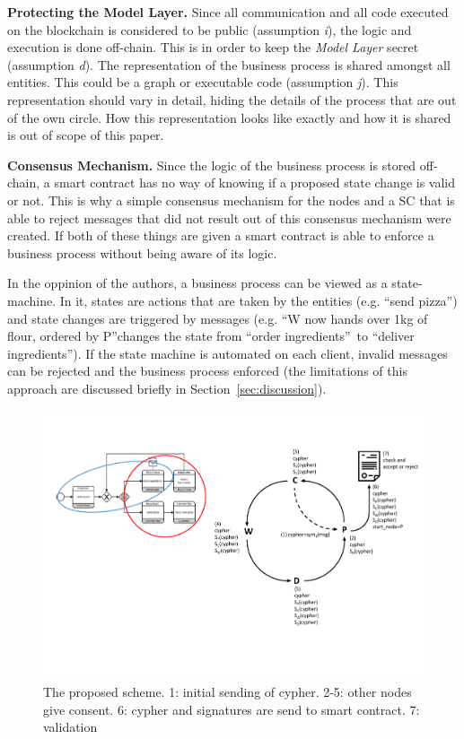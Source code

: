 \documentclass[runningheads]{llncs}
\newcommand{\ber}[1]{\textit{#1}}
\newcommand{\refsec}[1]{Section~\ref{#1}}
\renewcommand{\bigbreak}{}
\newcommand{\quotel}{``}
\newcommand{\quoter}{''}
\begin{document}
\bigbreak
\textbf{Protecting the Model Layer.} Since all communication and all code executed on the blockchain is considered to be public  (assumption \ber{i}), the logic and execution is done off-chain. This is in order to keep the \ber{Model Layer} secret (assumption \ber{d}). The representation of the business process is shared amongst all entities. This could be a graph or executable code (assumption \ber{j}). This representation should vary in detail, hiding the details of the process that are out of the own circle. How this representation looks like exactly and how it is shared is out of scope of this paper.


\bigbreak
\textbf{Consensus Mechanism.} Since the logic of the business process is stored off-chain, a smart contract has no way of knowing if a proposed state change is valid or not. This is why a simple consensus mechanism for the nodes and a SC that is able to reject messages that did not result out of this consensus mechanism were created. If both of these things are given a smart contract is able to enforce a business process without being aware of its logic. 

In the oppinion of the authors, a business process can be viewed as a state-machine. In it, states are actions that are taken by the entities (e.g. \quotel send pizza\quoter ) and state changes are triggered by messages (e.g. \quotel W now hands over 1kg of flour, ordered by P\quoter  changes the state from \quotel order ingredients\quoter \  to \quotel deliver ingredients\quoter ). If the state machine is automated on each client, invalid messages can be rejected and the business process enforced (the limitations of this approach are discussed briefly in \refsec{sec:discussion}).

\begin{center}
\begin{figure}
    \centering
    \includegraphics[trim=13cm 4cm 0cm 3cm,clip=true,scale=0.5]{schema.pdf}
    \caption{The proposed scheme. 1: initial sending of cypher. 2-5: other nodes give consent. 6: cypher and signatures are send to smart contract. 7: validation} 
    \label{fig:scheme}
\end{figure}
\end{center}
\end{document}
